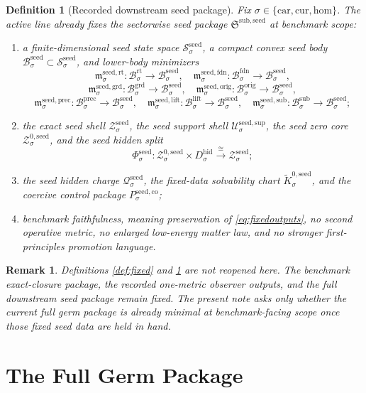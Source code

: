 \documentclass[11pt]{article}
\newcommand{\Car}{\mathrm{car}}
\newcommand{\Cur}{\mathrm{cur}}
\newcommand{\Hom}{\mathrm{hom}}
\newcommand{\RootBody}[1]{\mathcal B_{#1}^{\mathrm{rt}}}
\newcommand{\FoundationBody}[1]{\mathcal B_{#1}^{\mathrm{fdn}}}
\newcommand{\GroundBody}[1]{\mathcal B_{#1}^{\mathrm{grd}}}
\newcommand{\OriginBody}[1]{\mathcal B_{#1}^{\mathrm{orig}}}
\newcommand{\PrecursorBody}[1]{\mathcal B_{#1}^{\mathrm{prec}}}
\newcommand{\LiftBody}[1]{\mathcal B_{#1}^{\mathrm{lift}}}
\newcommand{\SubstrateBody}[1]{\mathcal B_{#1}^{\mathrm{sub}}}
\newcommand{\HiddenBody}[1]{D_{#1}^{\mathrm{hid}}}
\newcommand{\SeedPackage}{\mathfrak S^{\mathrm{sub,seed}}}
\newcommand{\SeedState}[1]{\mathcal S_{#1}^{\mathrm{seed}}}
\newcommand{\SeedBody}[1]{\mathcal B_{#1}^{\mathrm{seed}}}
\newcommand{\SeedShell}[1]{\mathcal Z_{#1}^{\mathrm{seed}}}
\newcommand{\SeedSupportShell}[1]{\mathcal U_{#1}^{\mathrm{seed,sup}}}
\newcommand{\SeedZeroCore}[1]{\mathcal Z_{#1}^{0,\mathrm{seed}}}
\newcommand{\SeedSplit}[1]{\Phi_{#1}^{\mathrm{seed}}}
\newcommand{\SeedRootMin}[1]{\mathfrak m_{#1}^{\mathrm{seed,rt}}}
\newcommand{\SeedFoundMin}[1]{\mathfrak m_{#1}^{\mathrm{seed,fdn}}}
\newcommand{\SeedGroundMin}[1]{\mathfrak m_{#1}^{\mathrm{seed,grd}}}
\newcommand{\SeedOrigMin}[1]{\mathfrak m_{#1}^{\mathrm{seed,orig}}}
\newcommand{\SeedPrecMin}[1]{\mathfrak m_{#1}^{\mathrm{seed,prec}}}
\newcommand{\SeedLiftMin}[1]{\mathfrak m_{#1}^{\mathrm{seed,lift}}}
\newcommand{\SeedSubMin}[1]{\mathfrak m_{#1}^{\mathrm{seed,sub}}}
\newcommand{\SeedCharge}[1]{\mathcal Q_{#1}^{\mathrm{seed}}}
\newcommand{\SeedKernel}[1]{\widetilde K_{#1}^{0,\mathrm{seed}}}
\newcommand{\SeedCoercive}[1]{P_{#1}^{\mathrm{seed,co}}}
\newtheorem{definition}{Definition}
\newtheorem{remark}{Remark}
\begin{document}
\begin{definition}[Recorded downstream seed package]
\label{def:seed}
Fix \(\sigma\in\{\Car,\Cur,\Hom\}\). The active line already fixes the sectorwise seed package \(\SeedPackage\) at benchmark scope:
\begin{enumerate}
    \item a finite-dimensional seed state space \(\SeedState{\sigma}\), a compact convex seed body \(\SeedBody{\sigma}\subset\SeedState{\sigma}\), and lower-body minimizers
    \[
    \SeedRootMin{\sigma}:\RootBody{\sigma}\to\SeedBody{\sigma},
    \quad
    \SeedFoundMin{\sigma}:\FoundationBody{\sigma}\to\SeedBody{\sigma},
    \]
    \[
    \SeedGroundMin{\sigma}:\GroundBody{\sigma}\to\SeedBody{\sigma},
    \quad
    \SeedOrigMin{\sigma}:\OriginBody{\sigma}\to\SeedBody{\sigma},
    \]
    \[
    \SeedPrecMin{\sigma}:\PrecursorBody{\sigma}\to\SeedBody{\sigma},
    \quad
    \SeedLiftMin{\sigma}:\LiftBody{\sigma}\to\SeedBody{\sigma},
    \quad
    \SeedSubMin{\sigma}:\SubstrateBody{\sigma}\to\SeedBody{\sigma};
    \]
    \item the exact seed shell \(\SeedShell{\sigma}\), the seed support shell \(\SeedSupportShell{\sigma}\), the seed zero core \(\SeedZeroCore{\sigma}\), and the seed hidden split
    \[
    \SeedSplit{\sigma}:
    \SeedZeroCore{\sigma}\times\HiddenBody{\sigma}
    \xrightarrow{\cong}
    \SeedShell{\sigma};
    \]
    \item the seed hidden charge \(\SeedCharge{\sigma}\), the fixed-data solvability chart \(\SeedKernel{\sigma}\), and the coercive control package \(\SeedCoercive{\sigma}\);
    \item benchmark faithfulness, meaning preservation of \eqref{eq:fixedoutputs}, no second operative metric, no enlarged low-energy matter law, and no stronger first-principles promotion language.
\end{enumerate}
\end{definition}

\begin{remark}
Definitions \ref{def:fixed} and \ref{def:seed} are not reopened here. The benchmark exact-closure package, the recorded one-metric observer outputs, and the full downstream seed package remain fixed. The present note asks only whether the current full germ package is already minimal at benchmark-facing scope once those fixed seed data are held in hand.
\end{remark}

\section{The Full Germ Package}
\end{document}
